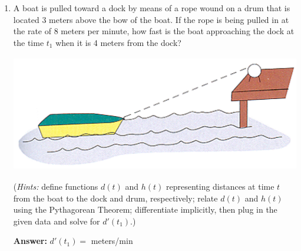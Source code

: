 \documentclass[fleqn,12pt]{article}
\newcommand{\<}{\ensuremath{\langle}}
\renewcommand{\>}{\ensuremath{\rangle}}
\begin{document}
\begin{enumerate}
\item A boat is pulled toward a dock by means of a rope wound on a drum that is
  located 3 meters above the bow of the boat. If the rope is being pulled in at the
  rate of 8 meters per minute, how fast is the boat approaching the dock at the time
  $t_1$ when it is 4 meters from the dock?
\begin{center}
  \includegraphics[height=2in]{Prob-3-6-58}
\end{center}
\noindent ({\it Hints:} 
define functions $d(t)$ and $h(t)$ representing distances
at time $t$ from the boat to the dock and drum, respectively; 
relate $d(t)$ and $h(t)$ using the Pythagorean Theorem; differentiate
implicitly, then plug in the given data and solve for $d'(t_1)$.)

\vfill

\hfill {\bf Answer:} $d'(t_1)= $ \phantom{XXXXXXXXXXXXX}meters/min \\
\phantom{XX} ~ \hfill  \underline{\phantom{XXXXXXXXXXXXXXXXXXXXX}}
\newpage



\end{enumerate}
\end{document}
